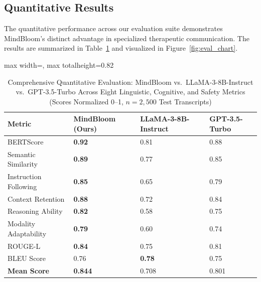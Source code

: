 \documentclass[12pt,twoside]{article}
\begin{document}
\subsection{Quantitative Results}

The quantitative performance across our evaluation suite demonstrates MindBloom's distinct advantage in specialized therapeutic communication. The results are summarized in Table~\ref{tab:eval_results} and visualized in Figure~\ref{fig:eval_chart}.

\begin{table}[htbp]
\centering
\Large
\renewcommand{\arraystretch}{2.4}
\setlength{\tabcolsep}{12pt}
\begin{adjustbox}{max width=\textwidth, max totalheight=0.82\textheight}
\begin{tabular}{|p{5.0cm}|p{3.8cm}|p{4.2cm}|p{3.8cm}|}
\hline
\rowcolor{gray!20}
\textbf{Metric} & \textbf{MindBloom (Ours)} & \textbf{LLaMA-3-8B-Instruct} & \textbf{GPT-3.5-Turbo} \\
\hline
BERTScore & \textbf{0.92} & 0.81 & 0.88 \\
\hline
Semantic Similarity & \textbf{0.89} & 0.77 & 0.85 \\
\hline
Instruction Following & \textbf{0.85} & 0.65 & 0.79 \\
\hline
Context Retention & \textbf{0.88} & 0.72 & 0.84 \\
\hline
Reasoning Ability & \textbf{0.82} & 0.58 & 0.75 \\
\hline
Modality Adaptability & \textbf{0.79} & 0.60 & 0.74 \\
\hline
ROUGE-L & \textbf{0.84} & 0.75 & 0.81 \\
\hline
BLEU Score & 0.76 & \textbf{0.78} & 0.75 \\
\hline
\rowcolor{gray!10}
\textbf{Mean Score} & \textbf{0.844} & 0.708 & 0.801 \\
\hline
\end{tabular}
\end{adjustbox}
\caption{Comprehensive Quantitative Evaluation: MindBloom vs.~LLaMA-3-8B-Instruct vs.~GPT-3.5-Turbo Across Eight Linguistic, Cognitive, and Safety Metrics (Scores Normalized 0--1, $n=2{,}500$ Test Transcripts)}
\label{tab:eval_results}
\end{table}

\end{document}
